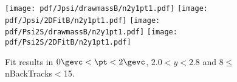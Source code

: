 \begin{figure}[H]
\begin{center}
\texttt{[image: pdf/Jpsi/drawmassB/n2y1pt1.pdf]}
\texttt{[image: pdf/Jpsi/2DFitB/n2y1pt1.pdf]}
\vspace*{-0.5cm}
\texttt{[image: pdf/Psi2S/drawmassB/n2y1pt1.pdf]}
\texttt{[image: pdf/Psi2S/2DFitB/n2y1pt1.pdf]}
\vspace*{-0.5cm}
\end{center}
\caption{Fit results in $0\gevc<\pt<2\gevc$, $2.0<y<2.8$ and 8$\leq$nBackTracks$<$15.}
\label{Fitn2y1pt1}
\end{figure}
